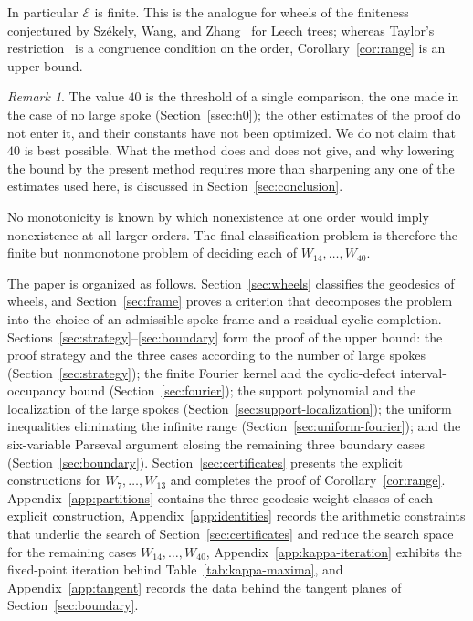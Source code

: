 \documentclass[11pt]{article}
\theoremstyle{definition}
\theoremstyle{remark}
\newtheorem{remark}[theorem]{Remark}
\numberwithin{equation}{section}
\newcommand{\calE}{\mathcal{E}}
\begin{document}
\noindent
In particular $\calE$ is finite. This is the analogue for wheels of the
finiteness conjectured by Sz\'ekely, Wang, and Zhang~\cite{SzekelyWangZhang2005}
for Leech trees; whereas Taylor's restriction~\cite{Taylor1977} is a congruence
condition on the order, Corollary~\ref{cor:range} is an upper bound.

\begin{remark}\label{rem:not-sharp}
The value $40$ is the threshold of a single comparison, the one made in the case
of no large spoke (Section~\ref{ssec:h0}); the other estimates of the proof do
not enter it, and their constants have not been optimized. We do not claim that
$40$ is best possible. What the method does and does not give, and why lowering
the bound by the present method requires more than sharpening any one of the
estimates used here, is discussed in Section~\ref{sec:conclusion}.
\end{remark}

No monotonicity is known by which nonexistence at one order would imply nonexistence at all larger orders. The final classification problem is therefore the finite but nonmonotone problem of deciding each of $W_{14},\ldots,W_{40}$.

The paper is organized as follows. Section~\ref{sec:wheels} classifies the geodesics of wheels, and Section~\ref{sec:frame} proves a criterion that decomposes the problem into the choice of an admissible spoke frame and a residual cyclic completion. Sections~\ref{sec:strategy}--\ref{sec:boundary} form the proof of the upper bound: the proof strategy and the three cases according to the number of large spokes (Section~\ref{sec:strategy}); the finite Fourier kernel and the cyclic-defect interval-occupancy bound (Section~\ref{sec:fourier}); the support polynomial and the localization of the large spokes (Section~\ref{sec:support-localization}); the uniform inequalities eliminating the infinite range (Section~\ref{sec:uniform-fourier}); and the six-variable Parseval argument closing the remaining three boundary cases (Section~\ref{sec:boundary}). Section~\ref{sec:certificates} presents the explicit constructions for $W_7,\ldots,W_{13}$ and completes the proof of Corollary~\ref{cor:range}. Appendix~\ref{app:partitions} contains the three geodesic weight classes of each explicit construction, Appendix~\ref{app:identities} records the arithmetic constraints that underlie the search of Section~\ref{sec:certificates} and reduce the search space for the remaining cases $W_{14},\ldots,W_{40}$, Appendix~\ref{app:kappa-iteration} exhibits the fixed-point iteration behind Table~\ref{tab:kappa-maxima}, and Appendix~\ref{app:tangent} records the data behind the tangent planes of Section~\ref{sec:boundary}.
\end{document}
